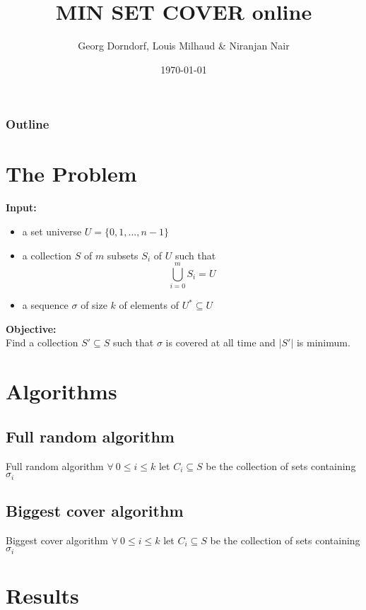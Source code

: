 \documentclass[aspectratio=169]{beamer}
\title{MIN SET COVER online}
\author{Georg Dorndorf, Louis Milhaud \& Niranjan Nair}
\institute{Université Paris Saclay}
\date{\today}
\begin{document}
    \begin{frame}
        \titlepage
    \end{frame}

    \begin{frame}
        \frametitle{Outline}
        \tableofcontents
    \end{frame}

    \section{The Problem}
    \begin{frame}
        \textbf{Input:}
        \begin{itemize}
            \item a set universe $U = \{0, 1, ..., n-1\}$
            \item a collection $S$ of $m$ subsets $S_i$ of $U$ such that $$\bigcup_{i = 0}^m S_i = U$$
            \item a sequence $\sigma$ of size $k$ of elements of $U^* \subseteq U$
        \end{itemize}
        \vspace{10pt}
        \textbf{Objective:}\\
        Find a collection $S' \subseteq S$ such that $\sigma$ is covered at all time and $|S'|$ is minimum.
    \end{frame}
    \section{Algorithms}
    
    \subsection{Full random algorithm}
    \begin{frame}{Full random algorithm}
        $\forall\ 0 \leq i \leq k$ let $C_i \subseteq S$ be the collection of sets containing $\sigma_i$
    \end{frame}
    
    \subsection{Biggest cover algorithm}
    \begin{frame}{Biggest cover algorithm}
        $\forall\ 0 \leq i \leq k$ let $C_i \subseteq S$ be the collection of sets containing $\sigma_i$
    \end{frame}
    \section{Results}
    \begin{frame}
        
    \end{frame}
\end{document}
